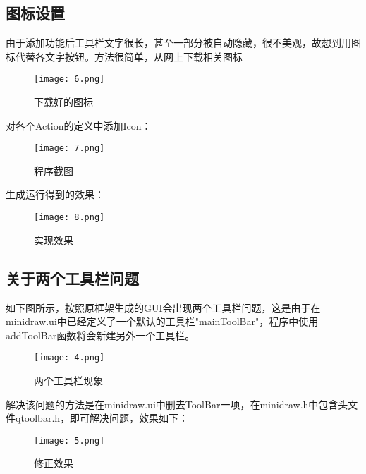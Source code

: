 \documentclass[14pt]{scrartcl} %
\begin{document}
\subsection{图标设置}
由于添加功能后工具栏文字很长，甚至一部分被自动隐藏，很不美观，故想到用图标代替各文字按钮。方法很简单，从网上下载相关图标
\begin{figure}[h] %
	\centering
	\texttt{[image: 6.png]} %
	\caption{下载好的图标}
\end{figure}

\pagebreak
对各个Action的定义中添加Icon：

\begin{figure}[h] %
	\centering
	\texttt{[image: 7.png]} %
	\caption{程序截图}
\end{figure}

生成运行得到的效果：

\begin{figure}[h] %
	\centering
	\texttt{[image: 8.png]} %
	\caption{实现效果}
\end{figure}

\pagebreak
\subsection{关于两个工具栏问题}

如下图所示，按照原框架生成的GUI会出现两个工具栏问题，这是由于在minidraw.ui中已经定义了一个默认的工具栏"mainToolBar"，程序中使用addToolBar函数将会新建另外一个工具栏。

\begin{figure}[h] %
	\centering
	\texttt{[image: 4.png]} %
	\caption{两个工具栏现象}
\end{figure}



解决该问题的方法是在minidraw.ui中删去ToolBar一项，在minidraw.h中包含头文件qtoolbar.h，即可解决问题，效果如下：

\begin{figure}[h] %
	\centering
	\texttt{[image: 5.png]} %
	\caption{修正效果}
\end{figure}
\end{document}
